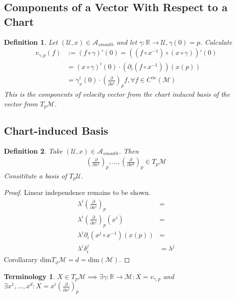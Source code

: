 \documentclass[10pt, oneside]{article}
\newcommand{\R}{\mathbb{R}}
\newcommand{\M}{\mathcal{M}}
\newtheorem{defn}{Definition}
\newtheorem{Terminology}{Terminology}
\begin{document}
   \subsection*{Components of a Vector With Respect to a Chart}
   \begin{defn}
      Let $(\mathcal{U},x) \in \mathcal{A}_{smooth}$ and let $\gamma: \R \to \mathcal{U}, \gamma(0) =p$. Calculate 
      \begin{align*}
         v_{\gamma,p}(f)&:= (f \circ \gamma)'(0) = ((f \circ x^{-1})\circ(x\circ \gamma))'(0) \\
         &= (x \circ \gamma)^i (0) \cdot(\partial_i(f \circ x^{-1}))(x(p)) \\
         &= \dot{\gamma}_x^i (0) \cdot(\frac{\partial}{\partial x^i})_p f, \forall f \in C^{\infty}(\M)
      \end{align*}
      This is the components of velocity vector from the chart induced basis of the vector from $T_p \M$.
   \end{defn}
   \subsection*{Chart-induced Basis}
   \begin{defn}
      Take $(\mathcal{U},x) \in \mathcal{A}_{smooth}$. Then
      \begin{align*}
         (\frac{\partial}{\partial x^1})_p, ..., (\frac{\partial}{\partial x^d})_p \in T_p \M
      \end{align*}
      Consititute a basis of $T_p \mathcal{U}$.
   \end{defn}
   \begin{proof}
      Linear independence remains to be shown. 
      \begin{align*}
         \lambda^i (\frac{\partial}{\partial x^i})_p &=  \\
         \lambda^i (\frac{\partial}{\partial x^i})_p(x^i) &=\\
         \lambda^i \partial_i (x^j \circ x^{-1})(x(p)) &=  \\
         \lambda^i \delta_i^j &= \lambda^j
      \end{align*}
      Corollarary $\text{dim}T_\phi \M = d = \text{dim}(\M)$.
   \end{proof}
   \begin{Terminology}
      $X \in T_p \M \implies \exists \gamma: \R \to \M: X= v_{\gamma,p}$ and $\exists x^1, ..., x^d: X = x^i(\frac{\partial}{\partial x^i})_p$
   \end{Terminology}
\end{document}
